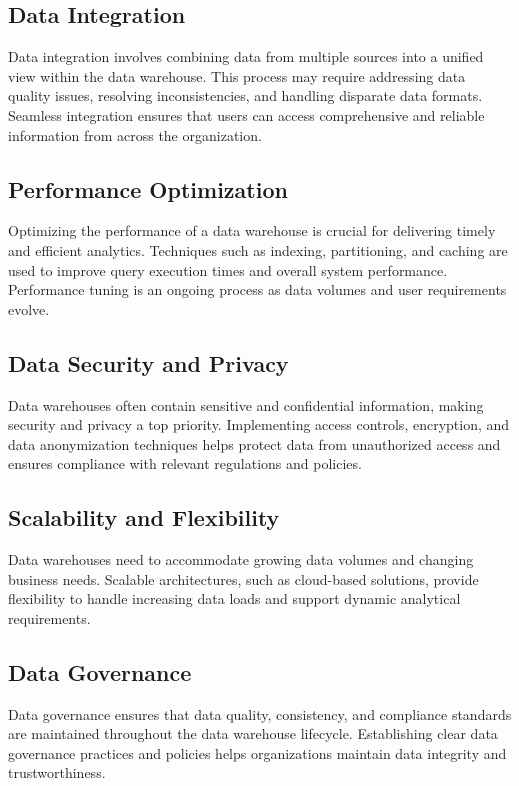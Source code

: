 \documentclass[conference]{IEEEtran}
\begin{document}
\subsection{Data Integration} Data integration involves combining data from multiple sources into a unified view within the data warehouse. This process may require addressing data quality issues, resolving inconsistencies, and handling disparate data formats. Seamless integration ensures that users can access comprehensive and reliable information from across the organization.

\subsection{Performance Optimization} Optimizing the performance of a data warehouse is crucial for delivering timely and efficient analytics. Techniques such as indexing, partitioning, and caching are used to improve query execution times and overall system performance. Performance tuning is an ongoing process as data volumes and user requirements evolve.

\subsection{Data Security and Privacy} Data warehouses often contain sensitive and confidential information, making security and privacy a top priority. Implementing access controls, encryption, and data anonymization techniques helps protect data from unauthorized access and ensures compliance with relevant regulations and policies.

\subsection{Scalability and Flexibility} Data warehouses need to accommodate growing data volumes and changing business needs. Scalable architectures, such as cloud-based solutions, provide flexibility to handle increasing data loads and support dynamic analytical requirements.

\subsection{Data Governance} Data governance ensures that data quality, consistency, and compliance standards are maintained throughout the data warehouse lifecycle. Establishing clear data governance practices and policies helps organizations maintain data integrity and trustworthiness.
\end{document}
